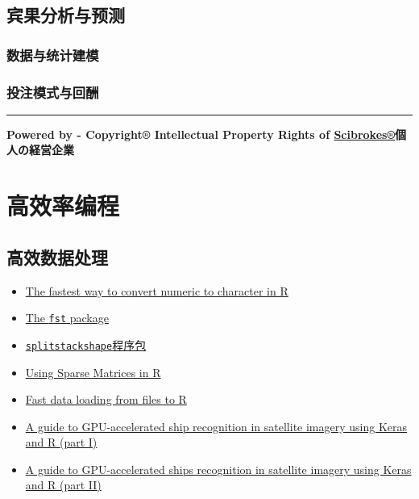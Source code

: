 \documentclass[]{book}
\theoremstyle{definition}
\theoremstyle{definition}
\theoremstyle{definition}
\theoremstyle{remark}
\begin{document}
\section{宾果分析与预测}

\subsection{数据与统计建模}\label{-3}

\subsection{投注模式与回酬}\label{-3}

\begin{center}\rule{0.5\linewidth}{\linethickness}\end{center}

\textbf{Powered by - Copyright® Intellectual Property Rights of
\href{http://www.scibrokes.com}{Scibrokes®}個人の経営企業}

\chapter{高效率编程}\label{hft}

\section{高效数据处理}

\begin{itemize}
\item
  \href{https://stackoverflow.com/questions/28447014/the-fastest-way-to-convert-numeric-to-character-in-r}{The
  fastest way to convert numeric to character in R}
\item
  \href{http://www.fstpackage.org/}{The \texttt{fst} package}
\item
  \href{https://d.cosx.org/d/420148-splitstackshape}{\texttt{splitstackshape}程序包}
\item
  \href{http://www.johnmyleswhite.com/notebook/2011/10/31/using-sparse-matrices-in-r/}{Using
  Sparse Matrices in R}
\item
  \href{https://appsilon.com/fast-data-loading-from-files-to-r/}{Fast
  data loading from files to R}
\item
  \href{https://appsilon.com/a-guide-to-gpu-accelerated-ship-recognition-in-satellite-imagery-using-keras-and-r-part-i/}{A
  guide to GPU-accelerated ship recognition in satellite imagery using
  Keras and R (part I)}
\item
  \href{https://appsilon.com/a-guide-to-gpu-accelerated-ships-recognition-in-satellite-imagery-using-keras-and-r-part-ii/}{A
  guide to GPU-accelerated ships recognition in satellite imagery using
  Keras and R (part II)}
\end{itemize}
\end{document}
